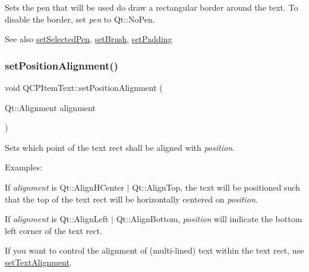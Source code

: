 Sets the pen that will be used do draw a rectangular border around the text. To disable the border, set {\itshape pen} to Qt\+::\+No\+Pen.

\begin{DoxySeeAlso}{See also}
\mbox{\hyperlink{class_q_c_p_item_text_a291febe586f0da3f1c392e77bef4aa20}{set\+Selected\+Pen}}, \mbox{\hyperlink{class_q_c_p_item_text_a1c7e131516df2ed8d941ef31240ded8e}{set\+Brush}}, \mbox{\hyperlink{class_q_c_p_item_text_aeea8a3e01f135f9dd0bb08f51db66310}{set\+Padding}} 
\end{DoxySeeAlso}
\mbox{\label{class_q_c_p_item_text_a781cdf8c640fc6a055dcff1e675c8c7a}} 
\subsubsection{\texorpdfstring{setPositionAlignment()}{setPositionAlignment()}}
{\footnotesize\ttfamily void Q\+C\+P\+Item\+Text\+::set\+Position\+Alignment (\begin{DoxyParamCaption}\item[{Qt\+::\+Alignment}]{alignment }\end{DoxyParamCaption})}

Sets which point of the text rect shall be aligned with {\itshape position}.

Examples\+: \begin{DoxyItemize}
\item If {\itshape alignment} is {\ttfamily Qt\+::\+Align\+H\+Center $\vert$ Qt\+::\+Align\+Top}, the text will be positioned such that the top of the text rect will be horizontally centered on {\itshape position}. \item If {\itshape alignment} is {\ttfamily Qt\+::\+Align\+Left $\vert$ Qt\+::\+Align\+Bottom}, {\itshape position} will indicate the bottom left corner of the text rect.\end{DoxyItemize}
If you want to control the alignment of (multi-\/lined) text within the text rect, use \mbox{\hyperlink{class_q_c_p_item_text_ab5bc0684c4d1bed81949a11b34dba478}{set\+Text\+Alignment}}. \mbox{\label{class_q_c_p_item_text_a4bcc10cd97952c3f749d75824b5077f0}} 
